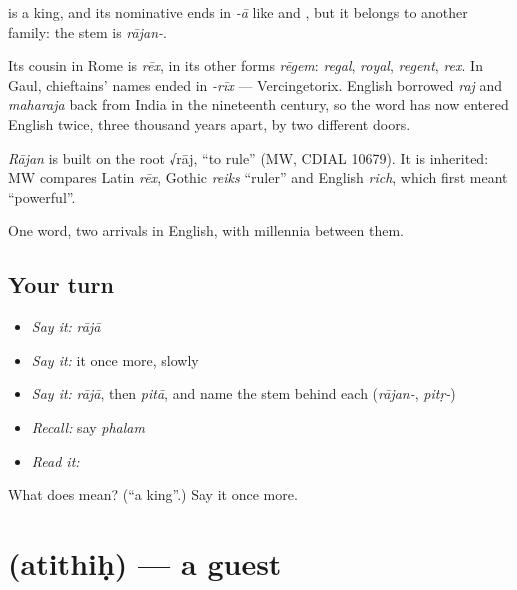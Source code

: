 \textbf{} is a king, and its nominative ends in \emph{-ā} like  and , but it belongs to another family: the stem is \emph{rājan-}.

Its cousin in Rome is \emph{rēx}, in its other forms \emph{rēgem}: \emph{regal}, \emph{royal}, \emph{regent}, \emph{rex}. In Gaul, chieftains' names ended in \emph{-rīx} — Vercingetorix. English borrowed \emph{raj} and \emph{maharaja} back from India in the nineteenth century, so the word has now entered English twice, three thousand years apart, by two different doors.

\begin{cousinweb}
\emph{Rājan} is built on the root √rāj, \textquotedblleft{}to rule\textquotedblright{} (MW, CDIAL 10679). It is inherited: MW compares Latin \emph{rēx}, Gothic \emph{reiks} \textquotedblleft{}ruler\textquotedblright{} and English \emph{rich}, which first meant \textquotedblleft{}powerful\textquotedblright{}.
\end{cousinweb}

\begin{grammarlens}[title={What you've built}]
One word, two arrivals in English, with millennia between them.
\end{grammarlens}

\subsection*{Your turn}
\begin{itemize}
\raggedright
  \item \emph{Say it:} \emph{rājā}
  \item \emph{Say it:} it once more, slowly
  \item \emph{Say it:} \emph{rājā}, then \emph{pitā}, and name the stem behind each (\emph{rājan-}, \emph{pitṛ-})
  \item \emph{Recall:} say \emph{phalam}
  \item \emph{Read it:} \textbf{}
\end{itemize}

\begin{tcolorbox}[breakable,colback=teal!4,colframe=teal!35!black,title={Before you move on}]
What does  mean? (\textquotedblleft{}a king\textquotedblright{}.) Say it once more.
\end{tcolorbox}
\section[\texorpdfstring{\sk{अतिथिः} (atithiḥ)}{अतिथिः (atithiḥ)}]{ (atithiḥ) — a guest}

